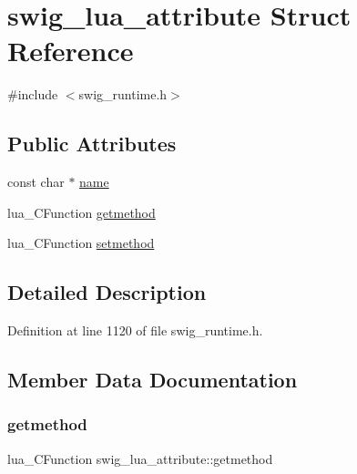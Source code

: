 \hypertarget{structswig__lua__attribute}{}\section{swig\+\_\+lua\+\_\+attribute Struct Reference}
\label{structswig__lua__attribute}


{\ttfamily \#include $<$swig\+\_\+runtime.\+h$>$}

\subsection*{Public Attributes}
\begin{DoxyCompactItemize}
\item 
const char $\ast$ \mbox{\hyperlink{structswig__lua__attribute_a693d9481784dfd89e0d9ed3aadf51b04}{name}}
\item 
lua\+\_\+\+C\+Function \mbox{\hyperlink{structswig__lua__attribute_ab18a92c81433b7b3de23856cda4b89b5}{getmethod}}
\item 
lua\+\_\+\+C\+Function \mbox{\hyperlink{structswig__lua__attribute_a0b88e38d5417453e7718f7090b797b06}{setmethod}}
\end{DoxyCompactItemize}


\subsection{Detailed Description}


Definition at line 1120 of file swig\+\_\+runtime.\+h.



\subsection{Member Data Documentation}
\mbox{\label{structswig__lua__attribute_ab18a92c81433b7b3de23856cda4b89b5}} 
\subsubsection{\texorpdfstring{getmethod}{getmethod}}
{\footnotesize\ttfamily lua\+\_\+\+C\+Function swig\+\_\+lua\+\_\+attribute\+::getmethod}



